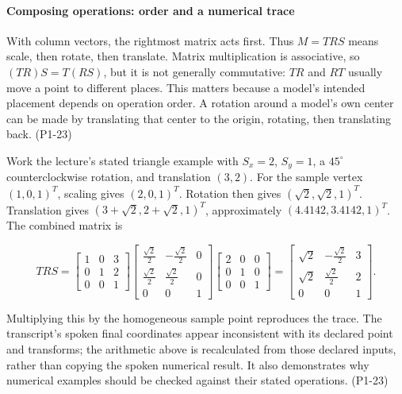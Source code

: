 \paragraph{Composing operations: order and a numerical trace}\label{composing-operations-order-and-a-numerical-trace}

With column vectors, the rightmost matrix acts first. Thus \(M=TRS\) means scale, then rotate, then translate. Matrix multiplication is associative, so \((TR)S=T(RS)\), but it is not generally commutative: \(TR\) and \(RT\) usually move a point to different places. This matters because a model's intended placement depends on operation order. A rotation around a model's own center can be made by translating that center to the origin, rotating, then translating back. (P1-23)

Work the lecture's stated triangle example with \(S_x=2\), \(S_y=1\), a \(45^\circ\) counterclockwise rotation, and translation \((3,2)\). For the sample vertex \((1,0,1)^T\), scaling gives \((2,0,1)^T\). Rotation then gives \((\sqrt2,\sqrt2,1)^T\). Translation gives \((3+\sqrt2,2+\sqrt2,1)^T\), approximately \((4.4142,3.4142,1)^T\). The combined matrix is

\[
TRS=\begin{bmatrix}1&0&3\\0&1&2\\0&0&1\end{bmatrix}
\begin{bmatrix}\frac{\sqrt2}{2}&-\frac{\sqrt2}{2}&0\\\frac{\sqrt2}{2}&\frac{\sqrt2}{2}&0\\0&0&1\end{bmatrix}
\begin{bmatrix}2&0&0\\0&1&0\\0&0&1\end{bmatrix}
=\begin{bmatrix}\sqrt2&-\frac{\sqrt2}{2}&3\\\sqrt2&\frac{\sqrt2}{2}&2\\0&0&1\end{bmatrix}.
\]

Multiplying this by the homogeneous sample point reproduces the trace. The transcript's spoken final coordinates appear inconsistent with its declared point and transforms; the arithmetic above is recalculated from those declared inputs, rather than copying the spoken numerical result. It also demonstrates why numerical examples should be checked against their stated operations. (P1-23)

